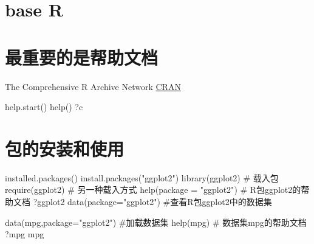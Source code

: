 \documentclass[
  letterpaper,
  DIV=11,
  numbers=noendperiod]{scrreprt}
\newenvironment{Shaded}{\begin{snugshade}}{\end{snugshade}}
\newcommand{\AttributeTok}[1]{\textcolor[rgb]{0.40,0.45,0.13}{#1}}
\newcommand{\CommentTok}[1]{\textcolor[rgb]{0.37,0.37,0.37}{#1}}
\newcommand{\FunctionTok}[1]{\textcolor[rgb]{0.28,0.35,0.67}{#1}}
\newcommand{\NormalTok}[1]{\textcolor[rgb]{0.00,0.23,0.31}{#1}}
\newcommand{\StringTok}[1]{\textcolor[rgb]{0.13,0.47,0.30}{#1}}
\begin{document}

\hypertarget{base-r}{%
\chapter*{base R}\label{base-r}}



\hypertarget{ux6700ux91cdux8981ux7684ux662fux5e2eux52a9ux6587ux6863}{%
\chapter*{最重要的是帮助文档}\label{ux6700ux91cdux8981ux7684ux662fux5e2eux52a9ux6587ux6863}}


The Comprehensive R Archive Network
\href{https://cran.r-project.org/}{CRAN}

\begin{Shaded}
\begin{Highlighting}[]
\FunctionTok{help.start}\NormalTok{()}
\FunctionTok{help}\NormalTok{()}
\NormalTok{?c}
\end{Highlighting}
\end{Shaded}


\hypertarget{ux5305ux7684ux5b89ux88c5ux548cux4f7fux7528}{%
\chapter*{包的安装和使用}\label{ux5305ux7684ux5b89ux88c5ux548cux4f7fux7528}}


\begin{Shaded}
\begin{Highlighting}[]
\FunctionTok{installed.packages}\NormalTok{()}
\FunctionTok{install.packages}\NormalTok{(}\StringTok{"ggplot2"}\NormalTok{) }
\FunctionTok{library}\NormalTok{(ggplot2) }\CommentTok{\# 载入包}
\FunctionTok{require}\NormalTok{(ggplot2) }\CommentTok{\# 另一种载入方式}
\FunctionTok{help}\NormalTok{(}\AttributeTok{package =} \StringTok{"ggplot2"}\NormalTok{) }\CommentTok{\# R包ggplot2的帮助文档}
\NormalTok{?ggplot2}
\FunctionTok{data}\NormalTok{(}\AttributeTok{package=}\StringTok{"ggplot2"}\NormalTok{)   }\CommentTok{\#查看R包ggplot2中的数据集}

\FunctionTok{data}\NormalTok{(mpg,}\AttributeTok{package=}\StringTok{"ggplot2"}\NormalTok{)  }\CommentTok{\#加载数据集}
\FunctionTok{help}\NormalTok{(mpg) }\CommentTok{\# 数据集mpg的帮助文档}
\NormalTok{?mpg}
\NormalTok{mpg}
\end{Highlighting}
\end{Shaded}
\end{document}
